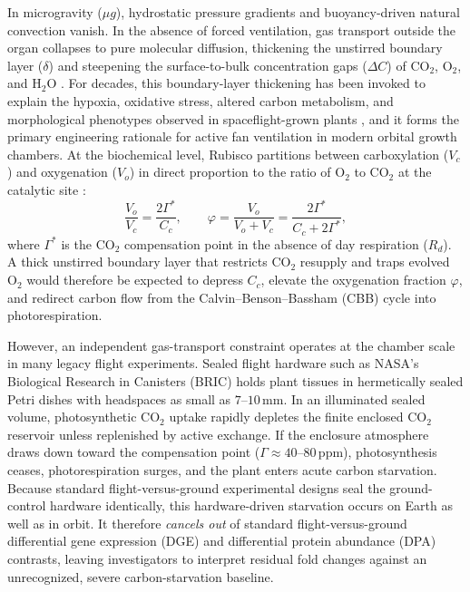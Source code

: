 \documentclass[10pt,twocolumn,a4paper]{article}
\begin{document}
In microgravity ($\mu g$), hydrostatic pressure gradients and buoyancy-driven natural convection vanish. In the absence of forced ventilation, gas transport outside the organ collapses to pure molecular diffusion, thickening the unstirred boundary layer ($\delta$) and steepening the surface-to-bulk concentration gaps ($\Delta C$) of $\mathrm{CO_2}$, $\mathrm{O_2}$, and $\mathrm{H_2O}$ \citep{porterfield2002,kitaya2003}. For decades, this boundary-layer thickening has been invoked to explain the hypoxia, oxidative stress, altered carbon metabolism, and morphological phenotypes observed in spaceflight-grown plants \citep{porterfield2002,correll2013,barker2023}, and it forms the primary engineering rationale for active fan ventilation in modern orbital growth chambers. At the biochemical level, Rubisco partitions between carboxylation ($V_c$) and oxygenation ($V_o$) in direct proportion to the ratio of $\mathrm{O_2}$ to $\mathrm{CO_2}$ at the catalytic site \citep{farquhar1980}:
\begin{equation}
\frac{V_o}{V_c} = \frac{2\Gamma^*}{C_c}, \qquad \varphi = \frac{V_o}{V_o + V_c} = \frac{2\Gamma^*}{C_c + 2\Gamma^*},
\label{eq:rubisco_partition}
\end{equation}
where $\Gamma^*$ is the $\mathrm{CO_2}$ compensation point in the absence of day respiration ($R_d$). A thick unstirred boundary layer that restricts $\mathrm{CO_2}$ resupply and traps evolved $\mathrm{O_2}$ would therefore be expected to depress $C_c$, elevate the oxygenation fraction $\varphi$, and redirect carbon flow from the Calvin--Benson--Bassham (CBB) cycle into photorespiration.

However, an independent gas-transport constraint operates at the chamber scale in many legacy flight experiments. Sealed flight hardware such as NASA's Biological Research in Canisters (BRIC) \citep{correll2013,osd522} holds plant tissues in hermetically sealed Petri dishes with headspaces as small as $7\text{--}10\,\mathrm{mm}$. In an illuminated sealed volume, photosynthetic $\mathrm{CO_2}$ uptake rapidly depletes the finite enclosed $\mathrm{CO_2}$ reservoir unless replenished by active exchange. If the enclosure atmosphere draws down toward the compensation point ($\Gamma \approx 40\text{--}80\,\mathrm{ppm}$), photosynthesis ceases, photorespiration surges, and the plant enters acute carbon starvation. Because standard flight-versus-ground experimental designs seal the ground-control hardware identically, this hardware-driven starvation occurs on Earth as well as in orbit. It therefore \emph{cancels out} of standard flight-versus-ground differential gene expression (DGE) and differential protein abundance (DPA) contrasts, leaving investigators to interpret residual fold changes against an unrecognized, severe carbon-starvation baseline.
\end{document}
